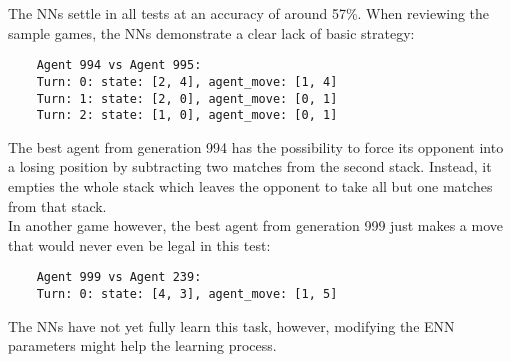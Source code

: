 The NNs settle in all tests at an accuracy of around 57\%.
When reviewing the sample games, the NNs demonstrate a clear lack of basic strategy:
\begin{verbatim}
    Agent 994 vs Agent 995:
    Turn: 0: state: [2, 4], agent_move: [1, 4]
    Turn: 1: state: [2, 0], agent_move: [0, 1]
    Turn: 2: state: [1, 0], agent_move: [0, 1]
\end{verbatim}
The best agent from generation 994 has the possibility to force its opponent into a losing position by subtracting two matches from the second stack.
Instead, it empties the whole stack which leaves the opponent to take all but one matches from that stack.
\\
In another game however, the best agent from generation 999 just makes a move that would never even be legal in this test:
\begin{verbatim}
    Agent 999 vs Agent 239:
    Turn: 0: state: [4, 3], agent_move: [1, 5]
\end{verbatim}
The NNs have not yet fully learn this task, however, modifying the ENN parameters might help the learning process.

